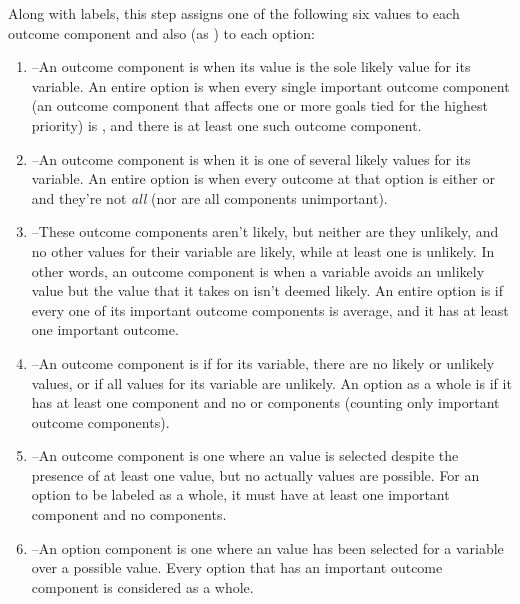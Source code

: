 \begin{enumerate}
    Along with  labels, this step assigns one of the following six  values to each outcome component and also (as ) to each option:
    \begin{enumerate}
      \item
        --An outcome component is  when its value is the sole likely value for its variable.
        An entire option is  when every single important outcome component (an outcome component that affects one or more goals tied for the highest priority) is , and there is at least one such outcome component.
      \item {}--An outcome component is  when it is one of several likely values for its variable.
        An entire option is  when every outcome at that option is either   or  and they're not \emph{all}  (nor are all components unimportant).
      \item {}--These outcome components aren't likely, but neither are they unlikely, and no other values for their variable are likely, while at least one is unlikely.
        In other words, an outcome component is  when a variable avoids an unlikely value but the value that it takes on isn't deemed likely.
        An entire option is  if every one of its important outcome components is average, and it has at least one important outcome.

      \item {}--An outcome component is  if for its variable, there are no likely or unlikely values, or if all values for its variable are unlikely.
        An option as a whole is  if it has at least one  component and no  or  components (counting only important outcome components).
      \item {}--An  outcome component is one where an  value is selected despite the presence of at least one  value, but no actually  values are possible.
        For an option to be labeled  as a whole, it must have at least one important  component and no  components.
      \item {}--An  option component is one where an  value has been selected for a variable over a possible  value.
        Every option that has an important  outcome component is considered  as a whole.
    \end{enumerate}


\end{enumerate}
